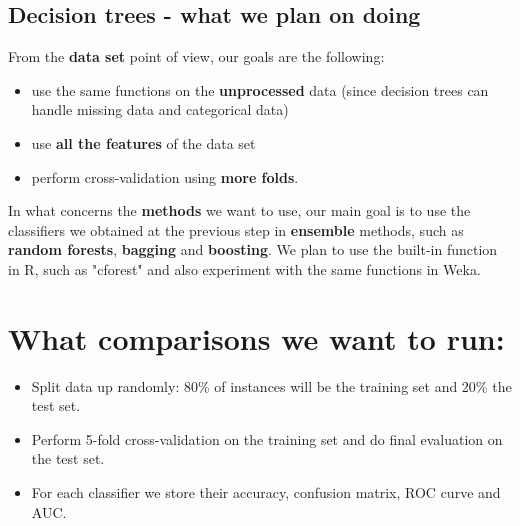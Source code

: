 \documentclass[a4paper,11pt]{article}
\begin{document}
\subsection*{Decision trees - what we plan on doing}
 	From the \textbf{data set} point of view, our goals are the following:
 	\begin{itemize}
 		\item  use the same functions on the \textbf{unprocessed} data (since decision trees can handle missing data and categorical data)
 		\item use \textbf{all the features} of the data set
 		\item perform cross-validation using \textbf{more folds}.
 	\end{itemize}
In what concerns the \textbf{methods} we want to use, our main goal is to use the classifiers we obtained at the previous step in \textbf{ensemble} methods, such as \textbf{random forests}, \textbf{bagging} and \textbf{boosting}. We plan to use the built-in function in R, such as "cforest" and also experiment with the same functions in Weka.





\section*{What comparisons we want to run:}

\begin{itemize}
	\item Split data up randomly: 80\% of instances will be the training set and 20\% the test set.
	\item Perform 5-fold cross-validation on the training set and do final evaluation on the test set.
	\item For each classifier we store their accuracy, confusion matrix, ROC curve and AUC.
\end{itemize}
\end{document}
